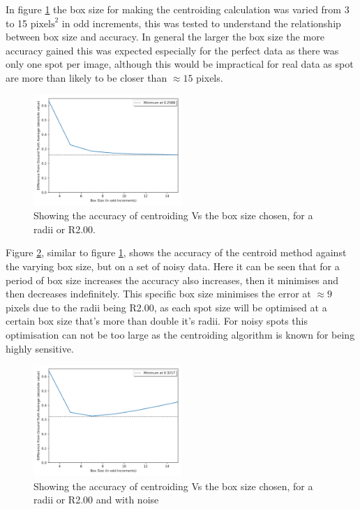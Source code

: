 \documentclass[aps,pra,a4paper,nofootinbib,onecolumn,tightenlines,longbibliography,12pt,amsfonts,amssymb,amsmath,floatfix]{revtex4-2} %
\begin{document}
  In figure \ref{fig:box_var_r2} the box size for making the centroiding calculation 
  was varied from 3 to 15 $\textrm{pixels}^2$ in odd increments, this was tested to understand the 
  relationship between box size and accuracy. In general the larger the box size the more accuracy 
  gained this was expected especially for the perfect data as there was only one spot per image, 
  although this would be impractical for real data as spot are more than likely to be closer than 
  $\approx 15$ pixels. 

  \begin{figure}[H]
    \begin{center}
      \includegraphics[width=0.5\textwidth]{project_pics/box_size_var_r2.png}
    \end{center}
    \caption{Showing the accuracy of centroiding Vs the box size chosen, for a radii or R2.00.}
    \label{fig:box_var_r2}
  \end{figure}

  Figure \ref{fig:noise_box_r2}, similar to figure \ref{fig:box_var_r2}, shows the accuracy of the 
  centroid method against the varying box size, but on a set of noisy data. Here it can be seen that 
  for a period of box size increases the accuracy also increases, then it minimises and then decreases indefinitely.
  This specific box size minimises the error at $\approx 9$ pixels due to the radii being R2.00, 
  as each spot size will be optimised at a certain box size that's more than double it's radii. For noisy spots 
  this optimisation can not be too large as the centroiding algorithm is known for being highly sensitive. \cite{delabie2014accurate}


  \begin{figure}[H]
    \begin{center}
      \includegraphics[width=0.5\textwidth]{project_pics/box_size_var_r2_noise.png}
    \end{center}
    \caption{Showing the accuracy of centroiding Vs the box size chosen, for a radii or R2.00 and with noise}
    \label{fig:noise_box_r2}
  \end{figure}
\end{document}
